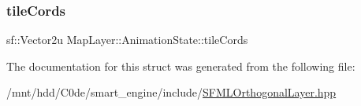 \subsubsection{\texorpdfstring{tile\+Cords}{tileCords}}
{\footnotesize\ttfamily sf\+::\+Vector2u Map\+Layer\+::\+Animation\+State\+::tile\+Cords}



The documentation for this struct was generated from the following file\+:\begin{DoxyCompactItemize}
\item 
/mnt/hdd/\+C0de/smart\+\_\+engine/include/\hyperlink{SFMLOrthogonalLayer_8hpp}{S\+F\+M\+L\+Orthogonal\+Layer.\+hpp}\end{DoxyCompactItemize}
